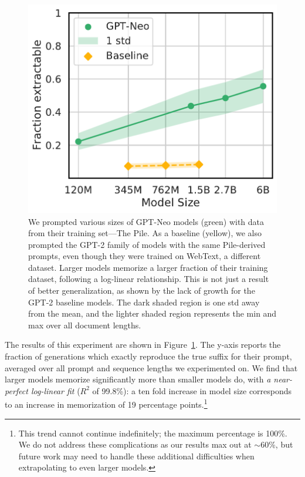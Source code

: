 \begin{figure}[h]
    \includegraphics[height=0.4\textwidth]{figures/exactly_mem-vs-model_size-prompt-all-gen-50-xlabel-ylabel.pdf} %
    \centering
    \caption{We prompted various sizes of GPT-Neo models (green) with data from their training set---The Pile. 
As a baseline (yellow), we also prompted the GPT-2 family of models with the same Pile-derived prompts, even though they were trained on WebText, a different dataset.
Larger models memorize a larger fraction of their training dataset, following a log-linear relationship.
This is not just a result of better generalization, as shown by the lack of growth for the GPT-2 baseline models.
The dark shaded region is one std away from the mean, and the lighter shaded region represents the min and max over all document lengths.
}
\label{fig:main-res-size}
\end{figure}

The results of this experiment are shown in Figure~\ref{fig:main-res-size}.
%
The y-axis reports the fraction of generations which exactly reproduce the true suffix for their prompt, averaged over all prompt and sequence lengths we experimented on.
%
We find that larger models memorize significantly more than smaller models do, with \emph{a near-perfect log-linear fit} ($R^2$ of 99.8\%): a ten fold increase in model size corresponds to an increase in memorization of 19 percentage points.\footnote{This trend cannot continue indefinitely; the maximum percentage is 100\%.
We do not address these complications as our results max out at $\sim$60\%, but future work may need to handle these additional difficulties when extrapolating to even larger models.}

